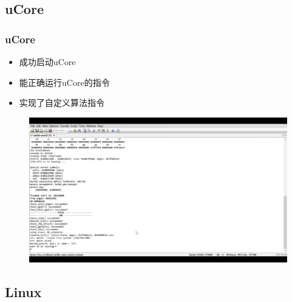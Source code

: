 \documentclass{beamer}
\begin{document}
\subsection{uCore}

\begin{frame}
    \frametitle{uCore}

    \begin{minipage}[c]{0.4\linewidth}
        \begin{itemize}
        \item 成功启动uCore
        \item 能正确运行uCore的指令
        \item 实现了自定义算法指令
    \end{itemize}
    \end{minipage}
    \hfill
    \begin{minipage}{0.5\linewidth}
        \begin{figure}
            \centering
            \includegraphics[width=1.1\textwidth]{pic/Ucore.pdf}
        \end{figure}
    \end{minipage}

\end{frame}

\subsection{Linux}
\end{document}
